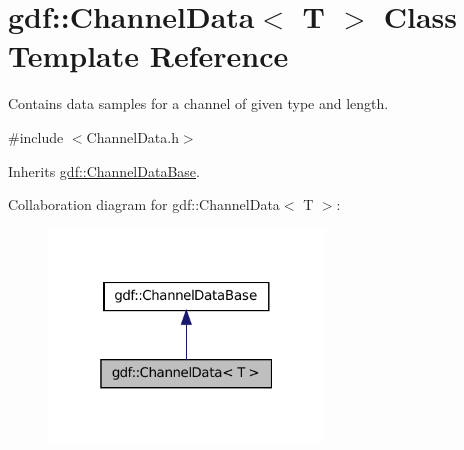 \hypertarget{classgdf_1_1_channel_data}{
\section{gdf::ChannelData$<$ T $>$ Class Template Reference}
\label{classgdf_1_1_channel_data}
}


Contains data samples for a channel of given type and length.  




{\ttfamily \#include $<$ChannelData.h$>$}



Inherits \hyperlink{classgdf_1_1_channel_data_base}{gdf::ChannelDataBase}.



Collaboration diagram for gdf::ChannelData$<$ T $>$:
\nopagebreak
\begin{figure}[H]
\begin{center}
\leavevmode
\includegraphics[width=208pt]{classgdf_1_1_channel_data__coll__graph}
\end{center}
\end{figure}
